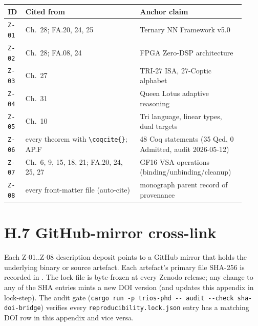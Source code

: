 \begin{small}
\begin{longtable}{@{}p{0.07\linewidth}p{0.45\linewidth}p{0.40\linewidth}@{}}
\toprule
\textbf{ID} & \textbf{Cited from} & \textbf{Anchor claim} \\
\midrule
\endhead
\texttt{Z-01} & Ch.~28; FA.20, 24, 25                  & Ternary NN Framework v5.0 \\
\texttt{Z-02} & Ch.~28; FA.08, 24                      & FPGA Zero-DSP architecture \\
\texttt{Z-03} & Ch.~27                                 & TRI-27 ISA, 27-Coptic alphabet \\
\texttt{Z-04} & Ch.~31                                 & Queen Lotus adaptive reasoning \\
\texttt{Z-05} & Ch.~10                                 & Tri language, linear types, dual targets \\
\texttt{Z-06} & every theorem with \texttt{\textbackslash coqcite\{\}}; AP.F & 48 Coq statements (35 Qed, 0 Admitted, audit 2026-05-12) \\
\texttt{Z-07} & Ch.~6, 9, 15, 18, 21; FA.20, 24, 25, 27 & GF16 VSA operations (binding/unbinding/cleanup) \\
\texttt{Z-08} & every front-matter file (auto-cite)    & monograph parent record of provenance \\
\bottomrule
\end{longtable}
\end{small}

\section*{H.7 GitHub-mirror cross-link}

\noindent Each Z-01..Z-08 description deposit points to a GitHub
mirror that holds the underlying binary or source artefact. Each
artefact's primary file SHA-256 is recorded in
. The lock-file is
byte-frozen at every Zenodo release; any change to any of the SHA
entries mints a new DOI version (and updates this appendix in
lock-step). The audit gate
(\texttt{cargo run -p trios-phd -{}-{} audit -{}-{}check sha-doi-bridge})
verifies every \texttt{reproducibility.lock.json} entry has a matching DOI
row in this appendix and vice versa.

